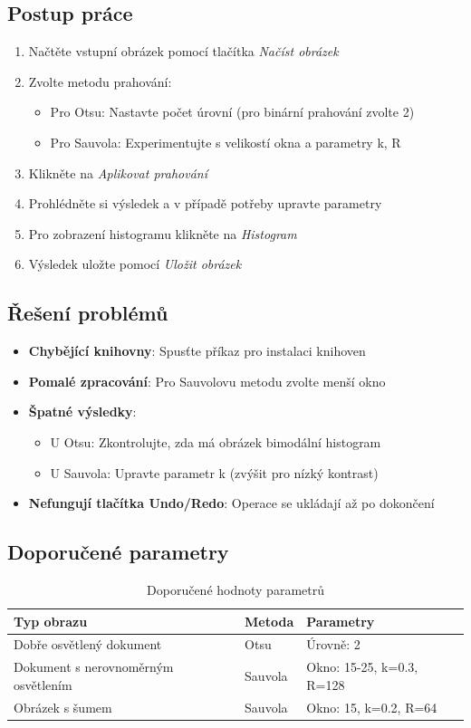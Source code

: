 \documentclass[12pt,a4paper]{article}
\begin{document}
\subsection{Postup práce}
\begin{enumerate}
\item Načtěte vstupní obrázek pomocí tlačítka \textit{Načíst obrázek}
\item Zvolte metodu prahování:
\begin{itemize}
\item Pro Otsu: Nastavte počet úrovní (pro binární prahování zvolte 2)
\item Pro Sauvola: Experimentujte s velikostí okna a parametry k, R
\end{itemize}
\item Klikněte na \textit{Aplikovat prahování}
\item Prohlédněte si výsledek a v případě potřeby upravte parametry
\item Pro zobrazení histogramu klikněte na \textit{Histogram}
\item Výsledek uložte pomocí \textit{Uložit obrázek}
\end{enumerate}

\subsection{Řešení problémů}
\begin{itemize}
\item \textbf{Chybějící knihovny}: Spusťte příkaz pro instalaci knihoven
\item \textbf{Pomalé zpracování}: Pro Sauvolovu metodu zvolte menší okno
\item \textbf{Špatné výsledky}:
\begin{itemize}
\item U Otsu: Zkontrolujte, zda má obrázek bimodální histogram
\item U Sauvola: Upravte parametr k (zvýšit pro nízký kontrast)
\end{itemize}
\item \textbf{Nefungují tlačítka Undo/Redo}: Operace se ukládají až po dokončení
\end{itemize}

\subsection{Doporučené parametry}
\begin{table}[h]
\centering
\caption{Doporučené hodnoty parametrů}
\begin{tabular}{|l|l|l|}
\hline
Typ obrazu & Metoda & Parametry \\
\hline
Dobře osvětlený dokument & Otsu & Úrovně: 2 \\
Dokument s nerovnoměrným osvětlením & Sauvola & Okno: 15-25, k=0.3, R=128 \\
Obrázek s šumem & Sauvola & Okno: 15, k=0.2, R=64 \\
\hline
\end{tabular}
\end{table}
\end{document}
